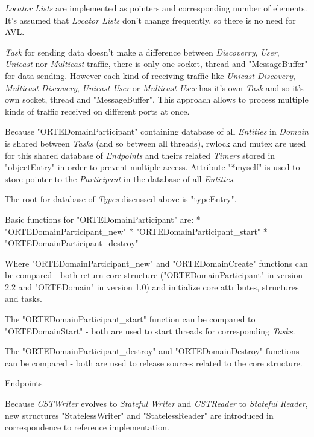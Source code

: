 {\em Locator Lists} are implemented as pointers and corresponding number of elements. It's assumed that {\em Locator Lists} don't change frequently, so there is no need for AVL.

{\em Task} for sending data doesn't make a difference between {\em Discoverry}, {\em User}, {\em Unicast} nor {\em Multicast} traffic, there is only one socket, thread and "MessageBuffer" for data sending. However each kind of receiving traffic like {\em Unicast Discovery}, {\em Multicast Discovery}, {\em Unicast User} or {\em Multicast User} has it's own {\em Task} and so it's own socket, thread and "MessageBuffer". This approach allows to process multiple kinds of traffic received on different ports at once.

Because "ORTEDomainParticipant" containing database of all {\em Entities} in {\em Domain} is shared between {\em Tasks} (and so between all threads), rwlock and mutex are used for this shared database of {\em Endpoints} and theirs related {\em Timers} stored in "objectEntry" in order to prevent multiple access. Attribute "*myself" is used to store pointer to the {\em Participant} in the database of all {\em Entities}.

The root for database of {\em Types} discussed above is "typeEntry".

Basic functions for "ORTEDomainParticipant" are:
\begitems
* "ORTEDomainParticipant_new"
* "ORTEDomainParticipant_start"
* "ORTEDomainParticipant_destroy"
\enditems

Where "ORTEDomainParticipant_new" and "ORTEDomainCreate" functions can be compared - both return core structure ("ORTEDomainParticipant" in version 2.2 and "ORTEDomain" in version 1.0) and initialize core attributes, structures and tasks.

The "ORTEDomainParticipant_start" function can be compared to "ORTEDomainStart" - both are used to start threads for corresponding {\em Tasks}.

The "ORTEDomainParticipant_destroy" and "ORTEDomainDestroy" functions can be compared  - both are used to release sources related to the core structure.

\secc Endpoints

Because {\em CSTWriter} evolves to {\em Stateful Writer} and {\em CSTReader} to {\em Stateful Reader}, new structures "StatelessWriter" and "StatelessReader" are introduced in correspondence to reference implementation.

